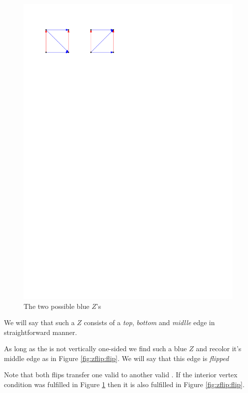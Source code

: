    \begin{figure}[h]
      \centering
      \includegraphics[scale=1]{unifiedAlgo/img/zflip/blueZ.pdf}
      \caption{The two possible blue $Z$'s}
      \label{fig:zflip:blueZ}
    \end{figure}

    We will say that such a $Z$ consists of a \emph{top}, \emph{bottom} and \emph{midlle} edge in straightforward manner. 


    As long as the \rel is not vertically one-sided we find such a blue $Z$ and recolor it's middle edge as in Figure \ref{fig:zflip:flip}. We will say that this edge is \emph{flipped}

    Note that both flips transfer one valid \rel to another valid \rel. If the interior vertex condition was fulfilled in Figure \ref{fig:zflip:blueZ} then it is also fulfilled in Figure \ref{fig:zflip:flip}.

